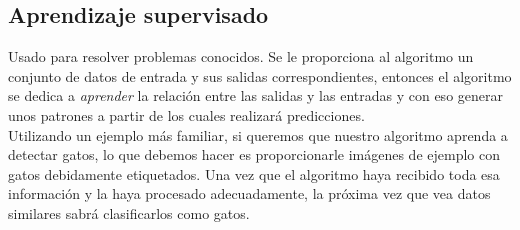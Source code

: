 \subsection{Aprendizaje supervisado}
\label{sec:aprendizaje_supervisado}

Usado para resolver problemas conocidos. Se le proporciona al algoritmo un conjunto de datos de entrada y sus salidas correspondientes, entonces el algoritmo se dedica a \textit{aprender} la relación entre las salidas y las entradas y con eso generar unos patrones a partir de los cuales realizará predicciones.\\

Utilizando un ejemplo más familiar, si queremos que nuestro algoritmo aprenda a detectar gatos, lo que debemos hacer es proporcionarle imágenes de ejemplo con gatos debidamente etiquetados. Una vez que el algoritmo haya recibido toda esa información y la haya procesado adecuadamente, la próxima vez que vea datos similares sabrá clasificarlos como gatos.\\

